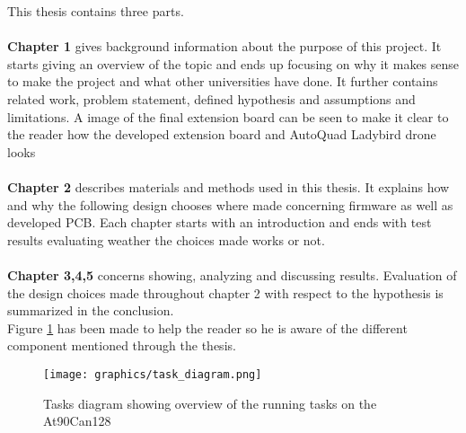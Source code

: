 This thesis contains three parts.\\ \\
\textbf{Chapter 1} gives background information about the purpose of this project. It starts giving an overview of the topic and ends up focusing on why it makes sense to make the project and what other universities have done. It further contains related work,  problem statement, defined hypothesis and assumptions and limitations. A image of the final extension board can be seen to make it clear to the reader how the developed extension board and AutoQuad Ladybird drone looks\\ \\
\textbf{Chapter 2} describes materials and methods used in this thesis. It explains how and why the following design chooses where made concerning firmware as well as developed PCB. Each chapter starts with an introduction and ends with test results evaluating weather the choices made works or not.\\ \\
\textbf{Chapter 3,4,5} concerns showing, analyzing and discussing results. Evaluation of the design choices made throughout chapter 2 with respect to the hypothesis is summarized in the conclusion. \\


Figure \ref{fig:drone_with_arrows} has been made to help the reader so he is aware of the different component mentioned through the thesis.
\begin{figure}[H]
    \center
    \texttt{[image: graphics/task\_diagram.png]}
  \caption{Tasks diagram showing overview of the running tasks on the At90Can128}
  \label{fig:drone_with_arrows}
\end{figure}